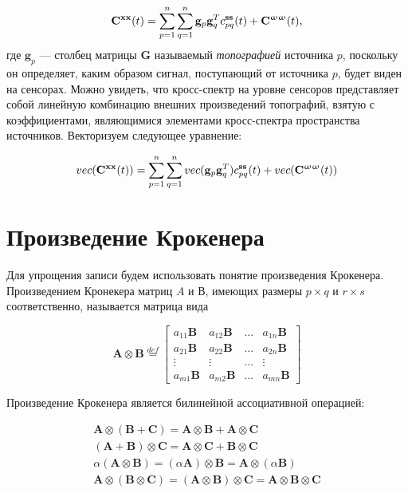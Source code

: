 \begin{gather}
    \mathbf{C}^{\mathbf{x x}}(t) = \sum\limits_{p=1}^n\sum\limits_{q=1}^n\mathbf{g}_p\mathbf{g}_q^T c_{pq}^{\mathbf{ss}}(t) + \mathbf{C}^{\mathbf{\upomega \upomega}}(t),
    \label{cp_rhs_expanded}
\end{gather}
где $\mathbf{g}_p$ --- столбец матрицы $\mathbf{G}$ называемый \emph{топографией} источника $p$, поскольку он определяет, каким образом сигнал, поступающий от источника $p$, будет виден на сенсорах. Можно увидеть, что кросс-спектр на уровне сенсоров представляет собой линейную комбинацию внешних произведений топографий, взятую с коэффициентами, являющимися элементами кросс-спектра пространства источников. Векторизуем следующее уравнение:

\begin{gather}
    vec(\mathbf{C}^{\mathbf{x x}}(t)) = \sum\limits_{p=1}^n\sum\limits_{q=1}^n vec(\mathbf{g}_p\mathbf{g}_q^T) c_{pq}^{\mathbf{ss}}(t) + vec(\mathbf{C}^{\mathbf{\upomega \upomega}}(t))
    \label{cp_rhs_vec}
\end{gather}

\section{Произведение Крокенера}
Для упрощения записи будем использовать понятие произведения Крокенера. Произведением Кронекера матриц $A$ и $В$, имеющих размеры $p\times q$ и $r\times s$ соответственно, называется матрица вида

\begin{equation}
    \mathbf{A} \otimes \mathbf{B} \stackrel{def}{=} 
    \begin{bmatrix}
        a_{11} \mathbf{B} & a_{12} \mathbf{B} & \dots & a_{1n} \mathbf{B} \\    
        a_{21} \mathbf{B} & a_{22} \mathbf{B} & \dots & a_{2n} \mathbf{B} \\    
        \vdots            & \vdots            & \dots & \vdots            \\
        a_{m1} \mathbf{B} & a_{m2} \mathbf{B} & \dots & a_{mn} \mathbf{B}   
        \label{kron_def}
     \end{bmatrix} 
\end{equation}

Произведение Крокенера является билинейной ассоциативной операцией:

\begin{gather}
     \mathbf{A} \otimes (\mathbf{B} + \mathbf{C}) = \mathbf{A} \otimes \mathbf{B} + \mathbf{A} \otimes \mathbf{C} \\
    (\mathbf{A} + \mathbf{B}) \otimes \mathbf{C} = \mathbf{A} \otimes \mathbf{C} + \mathbf{B} \otimes \mathbf{C} \\
    \alpha(\mathbf{A} \otimes \mathbf{B}) = (\alpha\mathbf{A}) \otimes \mathbf{B} = \mathbf{A} \otimes (\alpha\mathbf{B}) \\
    \mathbf{A} \otimes(\mathbf{B} \otimes \mathbf{C}) = 
   (\mathbf{A} \otimes \mathbf{B})\otimes \mathbf{C} =
    \mathbf{A} \otimes \mathbf{B} \otimes \mathbf{C}
\end{gather}

